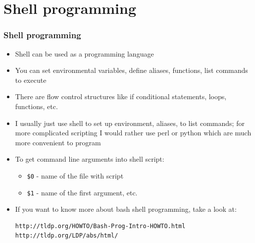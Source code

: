 \documentclass{beamer}
\begin{document}
\section{Shell programming}
\begin{frame}[fragile]
  \frametitle{Shell programming}
\begin{itemize}
\item Shell can be used as a programming language
\item You can set environmental variables, define aliases, functions, list commands to execute
\item There are flow control structures like if conditional statements, loops, functions, etc.
\item I usually just use shell to set up environment, aliases, to list commands; for more complicated scripting I would rather use perl or python which are much more convenient to program
\item To get command line arguments into shell script:
  \begin{itemize}
  \item {\color{mycolorcli}\verb|$0|} - name of the file with script
  \item  {\color{mycolorcli}\verb|$1|} - name of the first argument, etc.
  \end{itemize}
\item If you want to know more about bash shell programming, take a look at:
{\color{mycolorcli}
\begin{verbatim}
http://tldp.org/HOWTO/Bash-Prog-Intro-HOWTO.html
http://tldp.org/LDP/abs/html/
\end{verbatim}
}
\end{itemize}
\end{frame}
\end{document}
